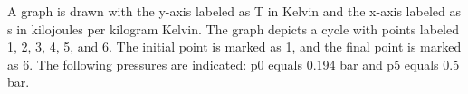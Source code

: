 A graph is drawn with the y-axis labeled as T in Kelvin and the x-axis labeled as s in kilojoules per kilogram Kelvin. The graph depicts a cycle with points labeled 1, 2, 3, 4, 5, and 6. The initial point is marked as 1, and the final point is marked as 6. The following pressures are indicated: p0 equals 0.194 bar and p5 equals 0.5 bar.